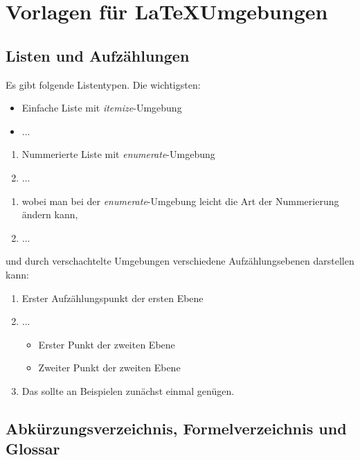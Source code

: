 \clearpage

\section{Vorlagen für \LaTeX Umgebungen}

\subsection{Listen und Aufzählungen}

Es gibt folgende Listentypen. Die wichtigsten:

\begin{itemize}
	\item Einfache Liste mit \textit{itemize}-Umgebung
	\item ...
\end{itemize}

\begin{enumerate}
	\item Nummerierte Liste mit \textit{enumerate}-Umgebung
	\item ...
\end{enumerate}

\begin{enumerate}[label=\alph*.]
	\item wobei man bei der \textit{enumerate}-Umgebung leicht die Art der Nummerierung ändern kann,
	\item ...
\end{enumerate}

und durch verschachtelte Umgebungen verschiedene Aufzählungsebenen darstellen kann:

\begin{enumerate}[label=\alph*)]
	\item Erster Aufzählungspunkt der ersten Ebene
	\item ...
	\begin{itemize}
		\item Erster Punkt der zweiten Ebene
		\item Zweiter Punkt der zweiten Ebene
	\end{itemize}
	\item Das sollte an Beispielen zunächst einmal genügen.
\end{enumerate}

\clearpage

\subsection{Abkürzungsverzeichnis, Formelverzeichnis und Glossar}

